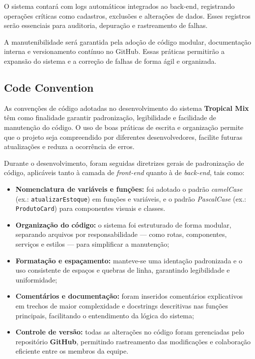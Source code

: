O sistema contará com logs automáticos integrados ao back-end, registrando operações críticas como cadastros, exclusões e alterações de dados. Esses registros serão essenciais para auditoria, depuração e rastreamento de falhas. 

A manutenibilidade será garantida pela adoção de código modular, documentação interna e versionamento contínuo no GitHub. Essas práticas permitirão a expansão do sistema e a correção de falhas de forma ágil e organizada.


\subsection{Code Convention}

As convenções de código adotadas no desenvolvimento do sistema \textbf{Tropical Mix} têm como finalidade garantir padronização, legibilidade e facilidade de manutenção do código. O uso de boas práticas de escrita e organização permite que o projeto seja compreendido por diferentes desenvolvedores, facilite futuras atualizações e reduza a ocorrência de erros.

Durante o desenvolvimento, foram seguidas diretrizes gerais de padronização de código, aplicáveis tanto à camada de \textit{front-end} quanto à de \textit{back-end}, tais como:

\begin{itemize}
    \item \textbf{Nomenclatura de variáveis e funções:} foi adotado o padrão \textit{camelCase} (ex.: \texttt{atualizarEstoque}) em funções e variáveis, e o padrão \textit{PascalCase} (ex.: \texttt{ProdutoCard}) para componentes visuais e classes.
    \item \textbf{Organização do código:} o sistema foi estruturado de forma modular, separando arquivos por responsabilidade — como rotas, componentes, serviços e estilos — para simplificar a manutenção;
    \item \textbf{Formatação e espaçamento:} manteve-se uma identação padronizada e o uso consistente de espaços e quebras de linha, garantindo legibilidade e uniformidade;
    \item \textbf{Comentários e documentação:} foram inseridos comentários explicativos em trechos de maior complexidade e docstrings descritivas nas funções principais, facilitando o entendimento da lógica do sistema;
    \item \textbf{Controle de versão:} todas as alterações no código foram gerenciadas pelo repositório \textbf{GitHub}, permitindo rastreamento das modificações e colaboração eficiente entre os membros da equipe.
\end{itemize}


